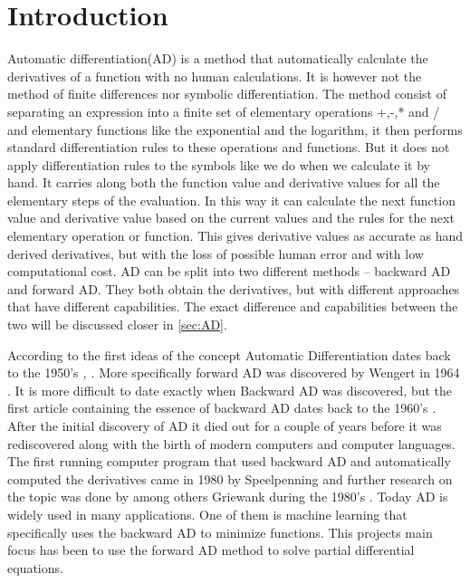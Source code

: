 \chapter{Introduction}
Automatic differentiation(AD) is a method that automatically calculate the derivatives of a function with no human calculations. It is however not the method of finite differences nor symbolic differentiation. The method consist of separating an expression into a finite set of elementary operations +,-,* and / and elementary functions like the exponential and the logarithm, it then performs standard differentiation rules to these operations and functions. But it does not apply differentiation rules to the symbols like we do when we calculate it by hand. It carries along both the function value and derivative values for all the elementary steps of the evaluation. In this way it can calculate the next function value and derivative value based on the current values and the rules for the next elementary operation or function. This gives derivative values as accurate as hand derived derivatives, but with the loss of possible human error and with low computational cost. AD can be split into two different methods -- backward AD and forward AD. They both obtain the derivatives, but with different approaches that have different capabilities. The exact difference and capabilities between the two will be discussed closer in \autoref{sec:AD}. 

According to \emph{\citep{SurveyAD}} the first ideas of the concept Automatic Differentiation dates back to the 1950's \emph{\citep{nolan1953analytical}, \citep{beda1959programs}}. More specifically forward AD was discovered by Wengert in 1964 \emph{\citep{wengert1964simple}}. It is more difficult to date exactly when Backward AD was discovered, but the first article containing the essence of backward AD dates back to the 1960's \emph{\citep{boltyanskii1960theory}}. After the initial discovery of AD it died out for a couple of years before it was rediscovered along with the birth of modern computers and computer languages. The first running computer program that used backward AD and automatically computed the derivatives came in 1980 by Speelpenning \emph{\citep{speelpenning1980compiling}} and further research on the topic was done by among others Griewank during the 1980's \emph{\citep{griewank1989automatic}}. Today AD is widely used in many applications. One of them is machine learning that specifically uses the backward AD to minimize functions. This projects main focus has been to use the forward AD method to solve partial differential equations. 

